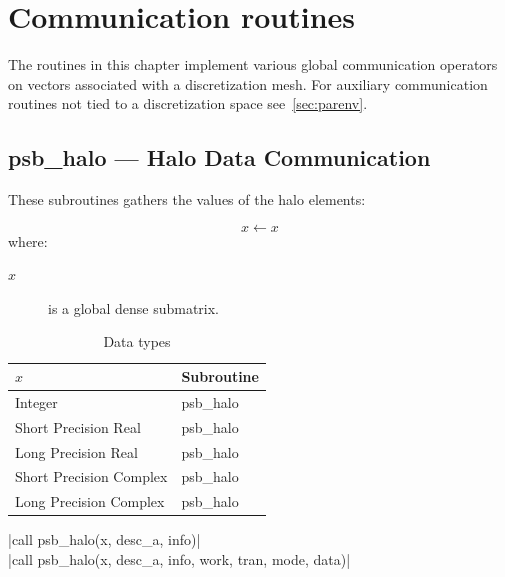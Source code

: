 \section{Communication routines}
%
%
The routines in this chapter implement various global communication operators
on vectors associated with a discretization mesh. For auxiliary communication
routines not tied to a discretization space see~\ref{sec:parenv}.

\clearpage\subsection{psb\_halo --- Halo Data Communication}
    

These subroutines gathers the values of the halo
elements:

\[ x \leftarrow x \]
where:
\begin{description}
\item[$x$] is a global dense  submatrix.
\end{description}

\begin{table}[h]
\begin{center}
\begin{tabular}{ll}
\hline
$x$ & {\bf Subroutine}\\
\hline
Integer           & psb\_halo \\
Short Precision Real & psb\_halo \\
Long Precision Real & psb\_halo \\
Short Precision Complex & psb\_halo \\
Long Precision Complex & psb\_halo \\
\hline
\end{tabular}
\end{center}
\caption{Data types\label{tab:f90halo}}
\end{table}

\noindent\fortinline|call psb_halo(x, desc_a, info)|\\
\fortinline|call psb_halo(x, desc_a, info, work, tran, mode, data)|

